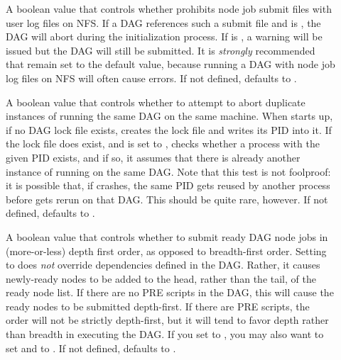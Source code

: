 \begin{description}
\item[]
\label{param:DAGManLogOnNfsIsError}
A boolean value that controls whether  prohibits
node job submit files with user log files on NFS.  If a DAG
references such a submit file and 
is , the DAG will abort during the initialization process. 
If  is , a warning
will be issued but the DAG will still be submitted.  It is \emph{strongly}
recommended that 
remain set to the default value, because running a DAG with node job
log files on NFS will often cause errors.
If not defined,  defaults to
.

\item[]
\label{param:DAGManAbortDuplicates}
A boolean value that controls whether to attempt to abort duplicate
instances of  running the same DAG on the same
machine.  When  starts up, if no DAG lock file exists,
 creates the lock file and writes its PID into it.  If
the lock file does exist, and  is
set to ,  checks whether a process with the
given PID exists, and if so, it assumes that there is already another
instance of  running on the same DAG.  Note that this
test is not foolproof: it is possible that, if  crashes,
the same PID gets reused by another process before 
gets rerun on that DAG.  This should be quite rare, however.
If not defined,  defaults to
.

\item[]
\label{param:DAGManSubmitDepthFirst}
A boolean value that controls whether to submit ready DAG node jobs
in (more-or-less) depth first order, as opposed to breadth-first order.
Setting  to  does
\emph{not} override dependencies defined in the DAG.  Rather, it
causes newly-ready nodes to be added to the head, rather than the tail,
of the ready node list.  If there are no PRE scripts in the DAG, this
will cause the ready nodes to be submitted depth-first.  If there
are PRE scripts, the order will not be strictly depth-first, but it
will tend to favor depth rather than breadth in executing the DAG.
If you set  to ,
you may also want to set  and
 to .
If not defined,  defaults to
.


\end{description}
